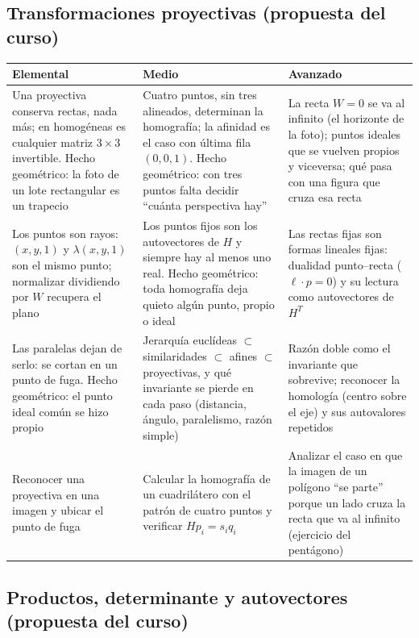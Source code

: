 \subsection{Transformaciones proyectivas (propuesta del curso)}

{\small
\begin{tabularx}{\textwidth}{YYY}
\toprule
\textbf{Elemental} & \textbf{Medio} & \textbf{Avanzado}\\
\midrule
Una proyectiva conserva rectas, nada más; en homogéneas es cualquier matriz \(3\times3\)
invertible. Hecho geométrico: la foto de un lote rectangular es un trapecio &
Cuatro puntos, sin tres alineados, determinan la homografía; la afinidad es el caso con
última fila \((0,0,1)\). Hecho geométrico: con tres puntos falta decidir ``cuánta
perspectiva hay'' &
La recta \(W=0\) se va al infinito (el horizonte de la foto); puntos ideales que se vuelven
propios y viceversa; qué pasa con una figura que cruza esa recta\\
\addlinespace
Los puntos son rayos: \((x,y,1)\) y \(\lambda(x,y,1)\) son el mismo punto; normalizar
dividiendo por \(W\) recupera el plano &
Los puntos fijos son los autovectores de \(H\) y siempre hay al menos uno real. Hecho
geométrico: toda homografía deja quieto algún punto, propio o ideal &
Las rectas fijas son formas lineales fijas: dualidad punto--recta (\(\ell\cdot p=0\)) y su
lectura como autovectores de \(H^{T}\)\\
\addlinespace
Las paralelas dejan de serlo: se cortan en un punto de fuga. Hecho geométrico: el punto
ideal común se hizo propio &
Jerarquía euclídeas \(\subset\) similaridades \(\subset\) afines \(\subset\) proyectivas, y
qué invariante se pierde en cada paso (distancia, ángulo, paralelismo, razón simple) &
Razón doble como el invariante que sobrevive; reconocer la homología (centro sobre el eje)
y sus autovalores repetidos\\
\addlinespace
Reconocer una proyectiva en una imagen y ubicar el punto de fuga &
Calcular la homografía de un cuadrilátero con el patrón de cuatro puntos y verificar
\(Hp_i=s_iq_i\) &
Analizar el caso en que la imagen de un polígono ``se parte'' porque un lado cruza la recta
que va al infinito (ejercicio del pentágono)\\
\bottomrule
\end{tabularx}
}

\subsection{Productos, determinante y autovectores (propuesta del curso)}

